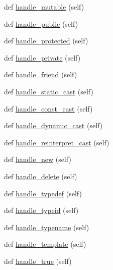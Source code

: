 \begin{DoxyCompactItemize}
def \mbox{\hyperlink{classcpp_1_1ast_1_1AstBuilder_a6a642353cfe2cddd1a60cbb1011df787}{handle\+\_\+mutable}} (self)
\item 
def \mbox{\hyperlink{classcpp_1_1ast_1_1AstBuilder_a1e69925578e0ee0a2b7aeb219eda449b}{handle\+\_\+public}} (self)
\item 
def \mbox{\hyperlink{classcpp_1_1ast_1_1AstBuilder_aa4ff62142927f8f245a2030b444676ee}{handle\+\_\+protected}} (self)
\item 
def \mbox{\hyperlink{classcpp_1_1ast_1_1AstBuilder_a8bc5f9563f5ead3abba5a71187162867}{handle\+\_\+private}} (self)
\item 
def \mbox{\hyperlink{classcpp_1_1ast_1_1AstBuilder_ab9f7d81019317c6ccfd492bd2c0c9579}{handle\+\_\+friend}} (self)
\item 
def \mbox{\hyperlink{classcpp_1_1ast_1_1AstBuilder_ab7577b3a2bd22c1bccb656493de379f3}{handle\+\_\+static\+\_\+cast}} (self)
\item 
def \mbox{\hyperlink{classcpp_1_1ast_1_1AstBuilder_a4dae74f1d036f63fc1080962ab0208fc}{handle\+\_\+const\+\_\+cast}} (self)
\item 
def \mbox{\hyperlink{classcpp_1_1ast_1_1AstBuilder_a659b5ad02ffebe26c1496a319128fbd1}{handle\+\_\+dynamic\+\_\+cast}} (self)
\item 
def \mbox{\hyperlink{classcpp_1_1ast_1_1AstBuilder_a06d75904ba7487c7966d073aaa3d74e9}{handle\+\_\+reinterpret\+\_\+cast}} (self)
\item 
def \mbox{\hyperlink{classcpp_1_1ast_1_1AstBuilder_a86f5769e0460524691ae0d135d30f101}{handle\+\_\+new}} (self)
\item 
def \mbox{\hyperlink{classcpp_1_1ast_1_1AstBuilder_aa5b7a781afe524bebdf42bdeb4766507}{handle\+\_\+delete}} (self)
\item 
def \mbox{\hyperlink{classcpp_1_1ast_1_1AstBuilder_a808eb3d955ca2e3a957abb35dc577c66}{handle\+\_\+typedef}} (self)
\item 
def \mbox{\hyperlink{classcpp_1_1ast_1_1AstBuilder_ac30cfc1a3a455310a9ccac885d2d0d7c}{handle\+\_\+typeid}} (self)
\item 
def \mbox{\hyperlink{classcpp_1_1ast_1_1AstBuilder_a4b7b3bb4f47f67052b04e5da173d1c6b}{handle\+\_\+typename}} (self)
\item 
def \mbox{\hyperlink{classcpp_1_1ast_1_1AstBuilder_a0f4d74520697ec05eb6b549daada5a5d}{handle\+\_\+template}} (self)
\item 
def \mbox{\hyperlink{classcpp_1_1ast_1_1AstBuilder_ad480255644817388b81b05acc4aa9c9a}{handle\+\_\+true}} (self)
\item 

\end{DoxyCompactItemize}
